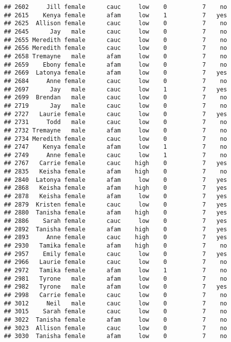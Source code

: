 \documentclass[
]{article}
\begin{document}
\begin{verbatim}
## 2602     Jill female      cauc     low    0          7    no
## 2615    Kenya female      afam     low    1          7   yes
## 2625  Allison female      cauc     low    0          7    no
## 2645      Jay   male      cauc     low    0          7    no
## 2655 Meredith female      cauc     low    0          7    no
## 2656 Meredith female      cauc     low    0          7    no
## 2658 Tremayne   male      afam     low    0          7    no
## 2659    Ebony female      afam     low    0          7    no
## 2669  Latonya female      afam     low    0          7   yes
## 2684     Anne female      cauc     low    0          7    no
## 2697      Jay   male      cauc     low    1          7   yes
## 2699  Brendan   male      cauc     low    0          7    no
## 2719      Jay   male      cauc     low    0          7    no
## 2727   Laurie female      cauc     low    0          7   yes
## 2731     Todd   male      cauc     low    0          7    no
## 2732 Tremayne   male      afam     low    0          7    no
## 2734 Meredith female      cauc     low    0          7    no
## 2747    Kenya female      afam     low    1          7    no
## 2749     Anne female      cauc     low    1          7    no
## 2767   Carrie female      cauc    high    0          7   yes
## 2835   Keisha female      afam    high    0          7    no
## 2840  Latonya female      afam     low    0          7   yes
## 2868   Keisha female      afam    high    0          7   yes
## 2878   Keisha female      afam     low    0          7   yes
## 2879  Kristen female      cauc     low    0          7   yes
## 2880  Tanisha female      afam    high    0          7   yes
## 2886    Sarah female      cauc     low    0          7   yes
## 2892  Tanisha female      afam    high    0          7   yes
## 2893     Anne female      cauc    high    0          7   yes
## 2930   Tamika female      afam    high    0          7    no
## 2957    Emily female      cauc     low    0          7   yes
## 2966   Laurie female      cauc     low    0          7    no
## 2972   Tamika female      afam     low    1          7    no
## 2981   Tyrone   male      afam     low    0          7    no
## 2982   Tyrone   male      afam     low    0          7   yes
## 2998   Carrie female      cauc     low    0          7    no
## 3012     Neil   male      cauc     low    0          7    no
## 3015    Sarah female      cauc     low    0          7    no
## 3022  Tanisha female      afam     low    0          7    no
## 3023  Allison female      cauc     low    0          7    no
## 3030  Tanisha female      afam     low    0          7    no

\end{verbatim}
\end{document}
